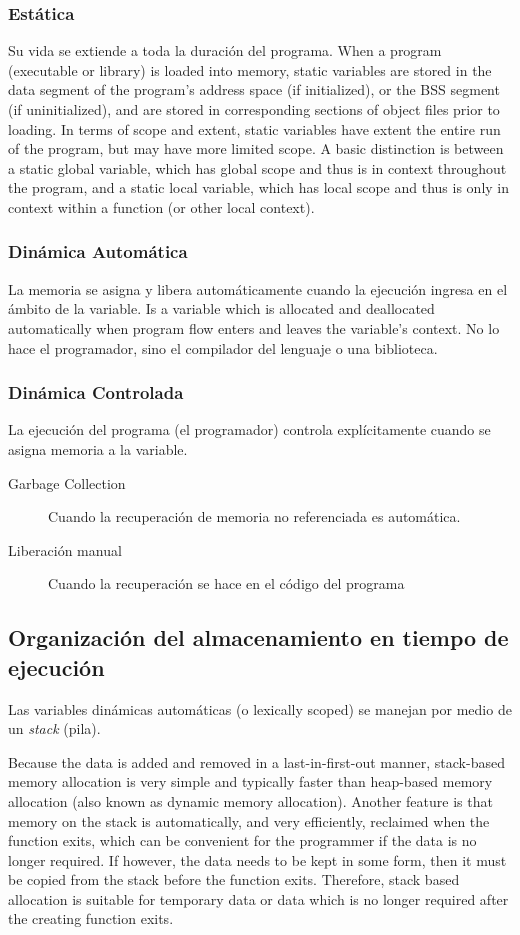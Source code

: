 \documentclass[a4paper, twoside]{article}
\begin{document}
\subsubsection{Estática}
Su vida se extiende a toda la duración del programa.
When a program (executable or library) is loaded into memory, static variables are stored in the data segment of the program's address space (if initialized), or the BSS segment (if uninitialized), and are stored in corresponding sections of object files prior to loading.
In terms of scope and extent, static variables have extent the entire run of the program, but may have more limited scope. A basic distinction is between a static global variable, which has global scope and thus is in context throughout the program, and a static local variable, which has local scope and thus is only in context within a function (or other local context).

\subsubsection{Dinámica Automática}
La memoria se asigna y libera automáticamente cuando la ejecución ingresa en el ámbito de la variable.
Is a variable which is allocated and deallocated automatically when program flow enters and leaves the variable's context. No lo hace el programador, sino el compilador del lenguaje o una biblioteca.

\subsubsection{Dinámica Controlada}
La ejecución del programa (el programador) controla explícitamente cuando se asigna memoria a la variable.
\begin{description}
	\item[Garbage Collection] Cuando la recuperación de memoria no referenciada es automática.
	\item[Liberación manual] Cuando la recuperación se hace en el código del programa
\end{description}

\subsection{Organización del almacenamiento en tiempo de ejecución}
Las variables dinámicas automáticas (o lexically scoped) se manejan por medio de un \emph{stack} (pila).

Because the data is added and removed in a last-in-first-out manner, stack-based memory allocation is very simple and typically faster than heap-based memory allocation (also known as dynamic memory allocation). Another feature is that memory on the stack is automatically, and very efficiently, reclaimed when the function exits, which can be convenient for the programmer if the data is no longer required. If however, the data needs to be kept in some form, then it must be copied from the stack before the function exits. Therefore, stack based allocation is suitable for temporary data or data which is no longer required after the creating function exits. 
\end{document}
